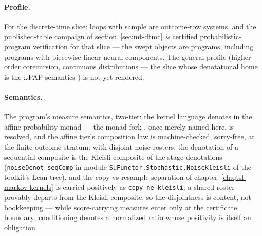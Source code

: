 \paragraph{Profile.} For the discrete-time slice: loops with
\textsf{sample} are outcome-row systems, and the published-table
campaign of section~\ref{sec:mt-dtmc} \emph{is} certified
probabilistic-program verification for that slice --- the swept
objects are programs, including programs with piecewise-linear
neural components. The general profile (higher-order corecursion,
continuous distributions --- the slice whose denotational home is
the $\omega$PAP semantics \cite{huot23}) is not yet rendered.

\paragraph{Semantics.} The program's measure semantics, two-tier:
the kernel language denotes in the affine probability monad --- the
monad fork \cite{dash22}, once merely named here, is resolved, and
the affine
tier's composition law is machine-checked, sorry-free, at the
finite-outcome stratum: with disjoint noise rosters, the denotation
of a sequential composite is the Kleisli composite of the stage
denotations (\texttt{noiseDenot\_seqComp} in module
\texttt{SuFunctor.Stochastic.NoiseKleisli} of the toolkit's Lean
tree), and the copy-vs-resample separation of
chapter~\ref{ch:qtsl-markov-kernels} is carried positively as
\texttt{copy\_ne\_kleisli}: a shared roster provably departs from
the Kleisli composite, so the disjointness is content, not
bookkeeping --- while score-carrying measures enter only at the
certificate boundary; conditioning denotes a normalized ratio whose
positivity is itself an obligation.


